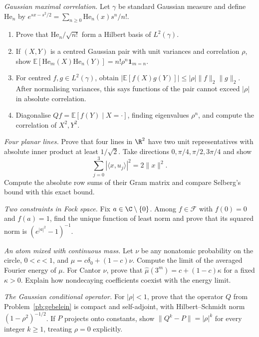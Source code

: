 \begin{exercise}[$\star\star\star$]\label{pb:gebelein}
\emph{Gaussian maximal correlation.} Let $\gamma$ be standard Gaussian measure and define $\mathrm{He}_n$ by $e^{sx-s^2/2}=\sum_{n\ge0}\mathrm{He}_n(x)s^n/n!$.
\begin{enumerate}[label=(\alph*)]
\item Prove that $\mathrm{He}_n/\sqrt{n!}$ form a Hilbert basis of $L^2(\gamma)$.
\item If $(X,Y)$ is a centred Gaussian pair with unit variances and correlation $\rho$, show $\mathbb E[\mathrm{He}_m(X)\mathrm{He}_n(Y)]=n!\rho^n\mathbf1_{m=n}$.
\item For centred $f,g\in L^2(\gamma)$, obtain $|\mathbb E[f(X)g(Y)]|\le|\rho|\|f\|_2\|g\|_2$. After normalising variances, this says functions of the pair cannot exceed $|\rho|$ in absolute correlation.
\item Diagonalise $Qf=\mathbb E[f(Y)\mid X=\cdot]$, finding eigenvalues $\rho^n$, and compute the correlation of $X^2,Y^2$.
\end{enumerate}
\end{exercise}

\begin{exercise}[$\star\star$]\label{ex:v8c16a}
\emph{Four planar lines.} Prove that four lines in $\R^2$ have two unit representatives with absolute inner product at least $1/\sqrt2$. Take directions $0,\pi/4,\pi/2,3\pi/4$ and show
\[\sum_{j=0}^3|\langle x,u_j\rangle|^2=2\|x\|^2.\]
Compute the absolute row sums of their Gram matrix and compare Selberg's bound with this exact bound.
\end{exercise}
\begin{exercise}[$\star\star$]\label{ex:v8c16b}
\emph{Two constraints in Fock space.} Fix $a\in\C\setminus\{0\}$. Among $f\in\mathcal F$ with $f(0)=0$ and $f(a)=1$, find the unique function of least norm and prove that its squared norm is $(e^{|a|^2}-1)^{-1}$.
\end{exercise}
\begin{exercise}[$\star\star$]\label{ex:v8c16c}
\emph{An atom mixed with continuous mass.} Let $\nu$ be any nonatomic probability on the circle, $0<c<1$, and $\mu=c\delta_0+(1-c)\nu$. Compute the limit of the averaged Fourier energy of $\mu$. For Cantor $\nu$, prove that $\hat\mu(3^m)=c+(1-c)\kappa$ for a fixed $\kappa>0$. Explain how nondecaying coefficients coexist with the energy limit.
\end{exercise}
\begin{exercise}[$\star\star$]\label{ex:v8c16d}
\emph{The Gaussian conditional operator.} For $|\rho|<1$, prove that the operator $Q$ from Problem~\ref{pb:gebelein} is compact and self-adjoint, with Hilbert--Schmidt norm $(1-\rho^2)^{-1/2}$. If $P$ projects onto constants, show $\|Q^k-P\|=|\rho|^k$ for every integer $k\ge1$, treating $\rho=0$ explicitly.
\end{exercise}

